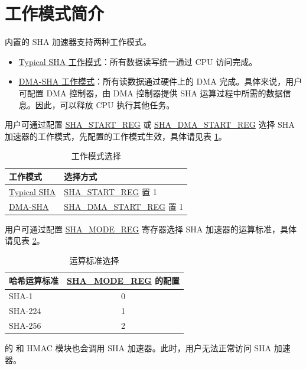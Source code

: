 \documentclass[main\_\_CN.tex]{subfiles}
\begin{document}
\section{工作模式简介}
\chipname{} 内置的 SHA 加速器支持两种工作模式。

\begin{itemize}
    \item \hyperref[sec:sha-typical-sha]{Typical SHA 工作模式}：所有数据读写统一通过 CPU 访问完成。
    \item \hyperref[sec:sha-dma-sha]{DMA-SHA 工作模式}：所有读数据通过硬件上的 DMA 完成。具体来说，用户可配置 DMA 控制器，由 DMA 控制器提供 SHA 运算过程中所需的数据信息。因此，可以释放 CPU 执行其他任务。
\end{itemize}    

用户可通过配置 \hyperref[regdesc:SHASTARTREG]{SHA\_START\_REG} 或 \hyperref[regdesc:SHADMASTARTREG]{SHA\_DMA\_START\_REG} 选择 SHA 加速器的工作模式，先配置的工作模式生效，具体请见表 \ref{tab:sha-working-mode}。

\begin{longtable}[c]{ |l|l| }
\caption{工作模式选择}
\label{tab:sha-working-mode}
\\\hline 
\rowcolor{lightgray}
工作模式      & 选择方式\\
    \hline
    \hyperref[sec:sha-typical-sha]{Typical SHA}      &  \hyperref[regdesc:SHASTARTREG]{SHA\_START\_REG} 置 1   \\
    \hline
    \hyperref[sec:sha-dma-sha]{DMA-SHA}           &  \hyperref[regdesc:SHADMASTARTREG]{SHA\_DMA\_START\_REG} 置 1   \\
    \hline
\end{longtable}

\clearpage
用户可通过配置 \hyperref[regdesc:SHAMODEREG]{SHA\_MODE\_REG} 寄存器选择 SHA 加速器的运算标准，具体请见表 \ref{tab:sha-hash-algo-select}。

\begin{longtable}[c]{|l|c|}
\caption{运算标准选择}
\label{tab:sha-hash-algo-select}
\\\hline
\rowcolor{lightgray}
哈希运算标准 & \hyperref[regdesc:SHAMODEREG]{SHA\_MODE\_REG} 的配置\\
    \hline
    SHA-1 & 0\\
    \hline
    SHA-224 & 1\\
    \hline
    SHA-256 & 2\\
    \hline
\end{longtable}


\begin{importantlisting}
\vspace{-0.5em}

    \chipname{} 的  和 HMAC 模块也会调用 SHA 加速器。此时，用户无法正常访问 SHA 加速器。
\end{importantlisting}
\end{document}
